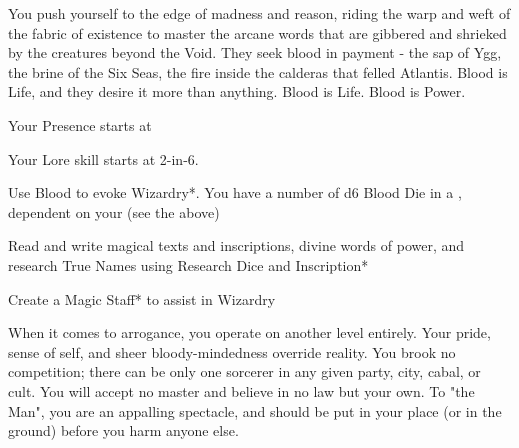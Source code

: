 {  \newpage



  You push yourself to the edge of madness and reason, riding the warp and weft of the fabric of existence to master the arcane words that are gibbered and shrieked by the creatures beyond the Void.  They seek blood in payment - the sap of  Ygg, the brine of the Six Seas, the fire inside the calderas that felled Atlantis.  Blood is Life, and they desire it more than anything.  Blood is Life.  Blood is Power.


  
  Your Presence starts at \DCUP

  Your Lore skill starts at 2-in-6.


  Use Blood to evoke Wizardry*.  You have a number of d6 Blood Die in a \POOL, dependent on your \LVL (see the  above)


  Read and write magical texts and inscriptions, divine words of power, and research True Names using Research Dice and Inscription*

  Create a Magic Staff* to assist in Wizardry

  When it comes to arrogance, you operate on another level entirely. Your pride, sense of self, and sheer bloody-mindedness override reality. You brook no competition; there can be only one sorcerer in any given party, city, cabal, or cult. You will accept no master and believe in no law but your own. To "the Man", you are an appalling spectacle, and should be put in your place (or in the ground) before you harm anyone else.

}
